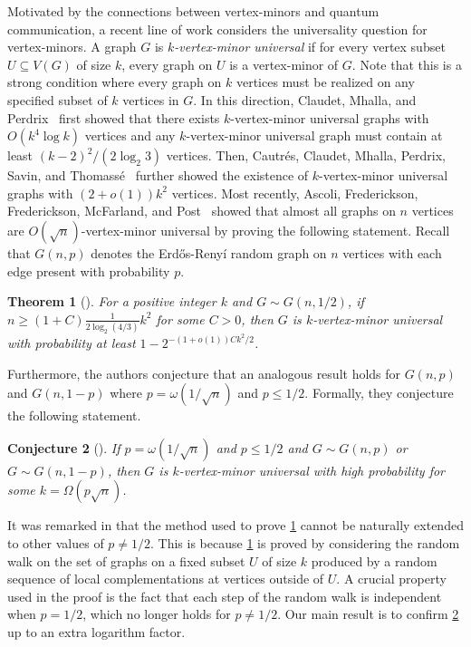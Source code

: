 \documentclass[reqno]{amsart}
\newtheorem{theorem}{Theorem}
\newtheorem{conj}[theorem]{Conjecture}
\theoremstyle{definition}
\numberwithin{theorem}{section}
\renewcommand{\le}{\leqslant}
\renewcommand{\ge}{\geqslant}
\begin{document}
Motivated by the connections between vertex-minors and quantum communication, a recent line of work considers the universality question for vertex-minors. A graph $G$ is \emph{$k$-vertex-minor universal} if for every vertex subset $U\subseteq V(G)$ of size $k$, every graph on $U$ is a vertex-minor of $G$. Note that this is a strong condition where every graph on $k$ vertices must be realized on any specified subset of $k$ vertices in $G$. In this direction, Claudet, Mhalla, and Perdrix~\cite{ClaudetMhallaPerdrix2023} first showed that there exists $k$-vertex-minor universal graphs with $O(k^4\log k)$ vertices and any $k$-vertex-minor universal graph must contain at least $(k-2)^2/(2\log_2 3)$ vertices. Then, Cautr\'es, Claudet, Mhalla, Perdrix, Savin, and Thomass{\'e}~\cite{CautresClaudetMhallaPerdrixSavinThomasse2024} further showed the existence of $k$-vertex-minor universal graphs with $(2+o(1))k^2$ vertices. Most recently, Ascoli, Frederickson, Frederickson, McFarland, and Post~\cite{AFFMP26} showed that almost all graphs on $n$ vertices are $O(\sqrt{n})$-vertex-minor universal by proving the following statement. Recall that $G(n,p)$ denotes the Erd\H{o}s-Reny\'i random graph on $n$ vertices with each edge present with probability $p$.





\begin{theorem}[\cite{AFFMP26}]\label{thm:1/2}
    For a positive integer $k$ and $G\sim G(n,1/2)$, if $n\ge (1+C)\frac{1}{2\log_2(4/3)}k^2$ for some $C>0$, then $G$ is $k$-vertex-minor universal with probability at least $1-2^{-(1+o(1))Ck^2/2}$.
\end{theorem}

Furthermore, the authors conjecture that an analogous result holds for $G(n,p)$ and $G(n,1-p)$ where $p=\omega(1/\sqrt{n})$ and $p\le 1/2$. Formally, they conjecture the following statement. 

\begin{conj}[\cite{AFFMP26}]\label{conj:all-p}
    If $p = \omega(1/\sqrt{n})$ and $p\le 1/2$ and $G\sim G(n,p)$ or $G\sim G(n,1-p)$, then $G$ is $k$-vertex-minor universal with high probability for some $k = \Omega(p\sqrt{n})$.
\end{conj}

It was remarked in \cite{AFFMP26} that the method used to prove \cref{thm:1/2} cannot be naturally extended to other values of $p\ne 1/2$. This is because \cref{thm:1/2} is proved by considering the random walk on the set of graphs on a fixed subset $U$ of size $k$ produced by a random sequence of local complementations at vertices outside of $U$. A crucial property used in the proof is the fact that each step of the random walk is independent when $p = 1/2$, which no longer holds for $p\ne 1/2$. Our main result is to confirm \cref{conj:all-p} up to an extra logarithm factor.
\end{document}

